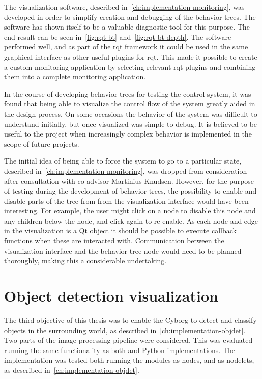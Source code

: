 \documentclass[\rootfolder/main.tex]{subfiles}
\begin{document}
The visualization software, described in~\cref{ch:implementation-monitoring}, was developed in order to simplify creation and debugging of the behavior trees.
The software has shown itself to be a valuable diagnostic tool for this purpose.
The end result can be seen in~\cref{fig:rqt-bt} and~\cref{fig:rqt-bt-depth}.
The software performed well, and as part of the rqt framework it could be used in the same graphical interface as other useful plugins for rqt.
This made it possible to create a custom monitoring application by selecting relevant rqt plugins and combining them into a complete monitoring application.

In the course of developing behavior trees for testing the control system, it was found that being able to visualize the control flow of the system greatly aided in the design process.
On some occasions the behavior of the system was difficult to understand initially, but once visualized was simple to debug.
It is believed to be useful to the project when increasingly complex behavior is implemented in the scope of future projects.

The initial idea of being able to force the system to go to a particular state, described in~\cref{ch:implementation-monitoring}, was dropped from consideration after consultation with co-advisor Martinius Knudsen.
However, for the purpose of testing during the development of behavior trees, the possibility to enable and disable parts of the tree from from the visualization interface would have been interesting.
For example, the user might click on a node to disable this node and any children below the node, and click again to re-enable.
As each node and edge in the visualization is a Qt object it should be possible to execute callback functions when these are interacted with.
Communication between the visualization interface and the behavior tree node would need to be planned thoroughly, making this a considerable undertaking.


\section{Object detection visualization}

The third objective of this thesis was to enable the Cyborg to detect and classify objects in the surrounding world, as described in~\cref{ch:implementation-objdet}.
Two parts of the image processing pipeline were considered.
This was evaluated running the same functionality as both \CC and Python implementations.
The \CC implementation was tested both running the modules as nodes, and as nodelets, as described in~\cref{ch:implementation-objdet}.
\end{document}
